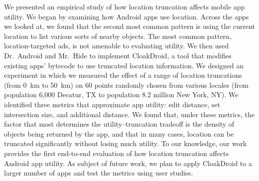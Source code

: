 \documentclass[10pt, conference, compsocconf]{IEEEtran}
\newcommand{\fuzzer}{CloakDroid\xspace}
\begin{document}
We presented an empirical study of how location truncation affects
mobile app utility. We began by examining how Android apps use
location. Across the apps we looked at, we found that the second most
common pattern is using the current location to list various sorts of
nearby objects. The most common pattern, location-targeted ads, is not
amenable to evaluating utility. We then used Dr.~Android and Mr.~Hide
to implement \fuzzer{}, a tool that
modifies existing apps' bytecode to use truncated location
information. We designed an experiment in which we measured the effect
of a range of location truncations (from 0~km to 50~km) on 60
points randomly chosen from various locales (from population 6,000
Decatur, TX to population 8.2 million New York, NY). We identified three
metrics that approximate app utility: edit distance, set intersection
size, and additional distance. We found that, under these metrics, the
factor that most determines the utility--truncation tradeoff is
the density of objects being returned by the app, and that in many
cases, location can be truncated significantly without losing much
utility. To our knowledge, our work provides the first end-to-end
evaluation of how location truncation affects Android app utility.
As subject of future work, we plan to apply CloakDroid to a larger 
number of apps and test the metrics using user studies.



\end{document}
